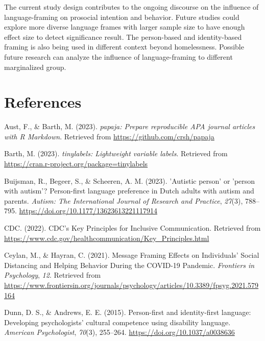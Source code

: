 \documentclass[
  man]{apa6}
\newlength{\cslhangindent}
\newlength{\cslentryspacingunit} %
\newenvironment{CSLReferences}[2] %
 {%
  \setlength{\parindent}{0pt}
  \ifodd #1
  \let\oldpar\par
  \def\par{\hangindent=\cslhangindent\oldpar}
  \fi
  \setlength{\parskip}{#2\cslentryspacingunit}
 }%
 {}
\begin{document}
The current study design contributes to the ongoing discourse on the influence of language-framing on prosocial intention and behavior. Future studies could explore more diverse language frames with larger sample size to have enough effect size to detect significance result. The person-based and identity-based framing is also being used in different context beyond homelessness. Possible future research can analyze the influence of language-framing to different marginalized group.

\newpage

\hypertarget{references}{%
\section{References}\label{references}}

\hypertarget{refs}{}
\begin{CSLReferences}{1}{0}
\leavevmode{}%
Aust, F., \& Barth, M. (2023). \emph{{papaja}: {Prepare} reproducible {APA} journal articles with {R Markdown}}. Retrieved from \url{https://github.com/crsh/papaja}

\leavevmode{}%
Barth, M. (2023). \emph{{tinylabels}: Lightweight variable labels}. Retrieved from \url{https://cran.r-project.org/package=tinylabels}

\leavevmode{}%
Buijsman, R., Begeer, S., \& Scheeren, A. M. (2023). '{Autistic} person' or 'person with autism'? {Person}-first language preference in {Dutch} adults with autism and parents. \emph{Autism: The International Journal of Research and Practice}, \emph{27}(3), 788--795. \url{https://doi.org/10.1177/13623613221117914}

\leavevmode{}%
CDC. (2022). {CDC}'s {Key} {Principles} for {Inclusive} {Communication}. Retrieved from \url{https://www.cdc.gov/healthcommunication/Key_Principles.html}

\leavevmode{}%
Ceylan, M., \& Hayran, C. (2021). Message {Framing} {Effects} on {Individuals}' {Social} {Distancing} and {Helping} {Behavior} {During} the {COVID}-19 {Pandemic}. \emph{Frontiers in Psychology}, \emph{12}. Retrieved from \url{https://www.frontiersin.org/journals/psychology/articles/10.3389/fpsyg.2021.579164}

\leavevmode{}%
Dunn, D. S., \& Andrews, E. E. (2015). Person-first and identity-first language: {Developing} psychologists' cultural competence using disability language. \emph{American Psychologist}, \emph{70}(3), 255--264. \url{https://doi.org/10.1037/a0038636}


\end{CSLReferences}
\end{document}
